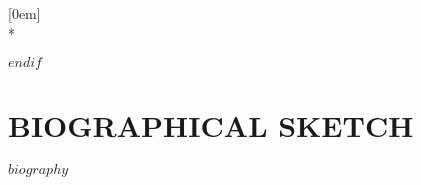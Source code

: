 \documentclass{ufdissertation} %
\begin{document}
       [0em]
        {\addvspace{8pt}}
        {\hspace*{-2em}\hspace*{2em}{\contentslabel{2em}}\hyper@linkend}
        {}
        {\hyper@linkend \\*}
        
$endif$






\chapter{BIOGRAPHICAL SKETCH}
\label{biography}
\vspace*{-0.5\baselineskip}      %
$biography$
        
\setlength\parindent{1cm}
\end{document}
